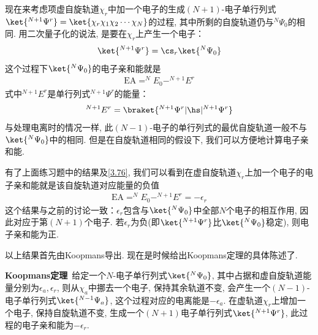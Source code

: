 
现在来考虑项虚自旋轨道$\chi_r$中加一个电子的生成$(N+1)$-电子单行列式$\ket{^{N+1}\Psi^r}=\ket{\chi_r\chi_1\chi_2\cdots\chi_N}$的过程, 
其中所剩的自旋轨道仍与$^N\Psi_0$的相同. 
用二次量子化的说法, 
是要在$\chi_r$上产生一个电子：
\begin{align}
	\ket{^{N+1}\Psi^r} = \cs_r\ket{^N\Psi_0}
\end{align}
这个过程下$\ket{^N\Psi_0}$的电子亲和能就是
\begin{align}
	\mathrm{EA} = ^NE_0 - ^{N+1}E^r
\end{align}
式中$ ^{N+1}E^r$是单行列式$^{N+1}\Psi^r$的能量：
\begin{align}
	^{N+1}E^r = \braket{^{N+1}\Psi^r|\hs|^{N+1}\Psi^r}
\end{align}
与处理电离时的情况一样, 
此$(N-1)$-电子的单行列式的最优自旋轨道一般不与$\ket{^N\Psi_0}$中的相同. 
但是在自旋轨道相同的假设下, 
我们可以方便地计算电子亲和能.


有了上面练习题中的结果及\autoref{3.76}, 
我们可以看到在虚自旋轨道$\chi_r$上加一个电子的电子亲和能就是该自旋轨道对应能量的负值
\begin{align}
	\mathrm{EA} = ^{N}E_0 - ^{N+1}E^r = -\epsilon_r
\end{align}
这个结果与之前的讨论一致：$\epsilon_r$包含与$\ket{^N\Psi_0}$中全部$N$个电子的相互作用, 
因此对应于第$(N+1)$个电子. 
若$\epsilon_r$为负(即$\ket{^{N+1}\Psi^r}$比$\ket{^N\Psi_0}$稳定), 
则电子亲和能为正.


以上结果首先由Koopmans导出. 
现在是时候给出Koopmans定理的具体陈述了.


\textbf{Koopmans定理}\ 给定一个$N$-电子\hft 单行列式$\ket{^N\Psi_0}$, 其中占据和虚自旋轨道能量分别为$\epsilon_a,\epsilon_r$, 则从$\chi_a$中挪去一个电子, 保持其余轨道不变, 会产生一个$(N-1)$-电子单行列式$\ket{^{N-1}\Psi_a}$, 这个过程对应的电离能是$-\epsilon_a$. 
在虚轨道$\chi_r$上增加一个电子, 保持自旋轨道不变, 生成一个$(N+1)$电子单行列式$\ket{^{N+1}\Psi^r}$, 此过程的电子亲和能为$-\epsilon_r$.

